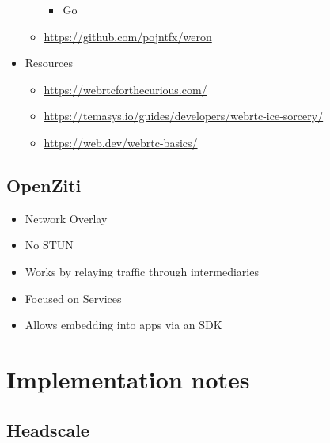 \begin{itemize}
\begin{itemize}
    \begin{itemize}
    \tightlist
    \item
      Go
    \end{itemize}
  \item
    \url{https://github.com/pojntfx/weron}
  \end{itemize}
\item
  Resources

  \begin{itemize}
  \tightlist
  \item
    \url{https://webrtcforthecurious.com/}
  \item
    \url{https://temasys.io/guides/developers/webrtc-ice-sorcery/}
  \item
    \href{https://web.dev/webrtc-basics/\#toc-rtcpeerconnection}{https://web.dev/webrtc-basics/}
  \end{itemize}
\end{itemize}

\hypertarget{openziti}{%
\section{OpenZiti}\label{openziti}}

\begin{itemize}
\tightlist
\item
  Network Overlay
\item
  No STUN
\item
  Works by relaying traffic through intermediaries
\item
  Focused on Services
\item
  Allows embedding into apps via an SDK
\end{itemize}

\hypertarget{implementation-notes}{%
\chapter{Implementation notes}\label{implementation-notes}}

\hypertarget{headscale}{%
\section{Headscale}\label{headscale}}


